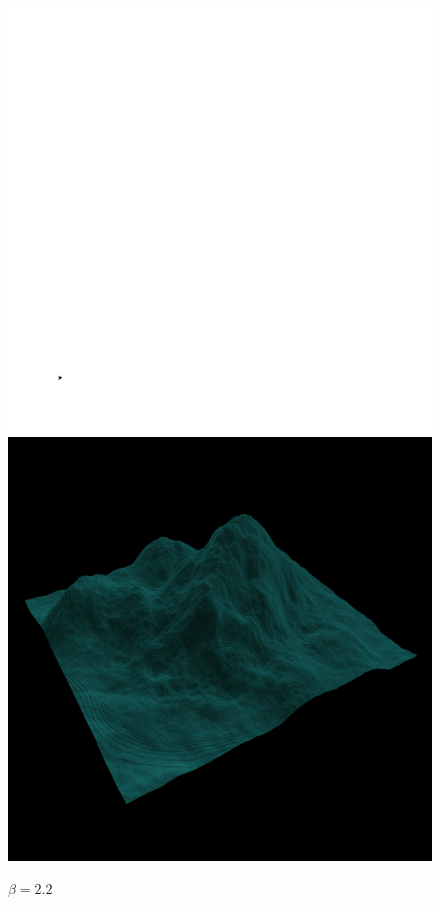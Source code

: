 		\begin{figure}[H]
		  \centering
		  \includegraphics[width=\imagewidth]{images/results/terrains/512-1/fourier/22}
		  \includegraphics[width=\imagewidth]{images/results/terrains/512-1/fourier/22_3d}
		  \caption{$\beta = 2.2$}
		  \label{fig:ex-fourier22-surface}
		\end{figure}
		
